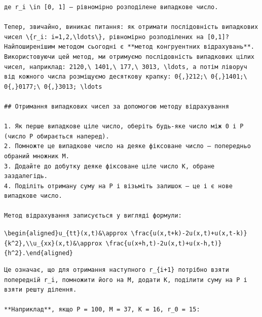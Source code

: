 \documentclass[
  ukrainian,
]{article}
\begin{document}
\begin{verbatim}
де r_i \in [0, 1] — рівномірно розподілене випадкове число.

Тепер, звичайно, виникає питання: як отримати послідовність випадкових чисел \{r_i: i=1,2,\ldots\}, рівномірно розподілених на [0,1]? Найпоширенішим методом сьогодні є **метод конгруентних відрахувань**. Використовуючи цей метод, ми отримуємо послідовність випадкових цілих чисел, наприклад: 2120,\ 1401,\ 177,\ 3013, \ldots, а потім ліворуч від кожного числа розміщуємо десяткову крапку: 0{,}212;\ 0{,}1401;\ 0{,}0177;\ 0{,}3013; \ldots

## Отримання випадкових чисел за допомогою методу відрахування

1. Як перше випадкове ціле число, оберіть будь-яке число між 0 і P (число P обирається наперед).
2. Помножте це випадкове число на деяке фіксоване число — попередньо обраний множник M.
3. Додайте до добутку деяке фіксоване ціле число K, обране заздалегідь.
4. Поділіть отриману суму на P і візьміть залишок — це і є нове випадкове число.

Метод відрахування записується у вигляді формули:
\end{verbatim}

\texttt{\textbackslash{}begin\{aligned\}u\_\{tt\}(x,t)\&\textbackslash{}approx\ \textbackslash{}frac\{u(x,t+k)-2u(x,t)+u(x,t-k)\}\{k\^{}2\},\textbackslash{}\textbackslash{}u\_\{xx\}(x,t)\&\textbackslash{}approx\ \textbackslash{}frac\{u(x+h,t)-2u(x,t)+u(x-h,t)\}\{h\^{}2\}.\textbackslash{}end\{aligned\}}

\begin{verbatim}
Це означає, що для отримання наступного r_{i+1} потрібно взяти попередній r_i, помножити його на M, додати K, поділити суму на P і взяти решту ділення.

**Наприклад**, якщо P = 100, M = 37, K = 16, r_0 = 15:
\end{verbatim}
\end{document}
